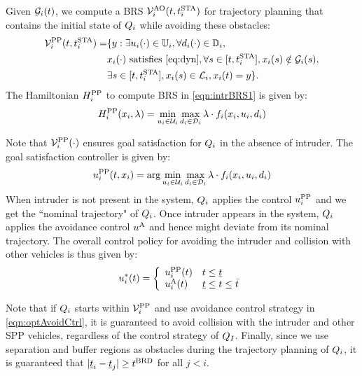 Given $\mathcal{G}_i(t)$, we compute a BRS $\mathcal{V}^{\text{AO}}_{i}(t, t^\text{STA}_i)$ for trajectory planning that contains the initial state of $Q_i$ while avoiding these obstacles:
\begin{equation} \label{eqn:intrBRS1}
\begin{aligned}
\brs^{\text{PP}}_{i}(t, \sta_i) = & \{y: \exists \ctrl_i(\cdot) \in \cfset_i, \forall \dstb_i(\cdot) \in \dfset_i, \\
& \state_i(\cdot) \text{ satisfies \eqref{eq:dyn}}, \forall s \in [t, \sta_i], \state_i(s) \notin \obsset_i(s), \\
& \exists s \in [t, \sta_i], \state_i(s) \in \targetset_i, \state_i(t) = y \}.
\end{aligned}
\end{equation}
The Hamiltonian $H^{\text{PP}}_{i}$ to compute BRS in \eqref{eqn:intrBRS1} is given by:
\begin{equation} \label{eqn:BRSham}
\ham^{\text{PP}}_{i}(\state_i, \costate) = \min_{\ctrl_i \in \cset_i} \max_{\dstb_i \in \dset_i} \costate \cdot f_i (\state_i, \ctrl_i, \dstb_i)
\end{equation}

Note that $\mathcal{V}^{\text{PP}}_{i}(\cdot)$ ensures goal satisfaction for $Q_i$ in the absence of intruder. The goal satisfaction controller is given by:
\begin{equation} \label{eqn:PPPolicy}
{\ctrl^{\text{PP}}_{i}}(t, \state_i) = \arg \min_{\ctrl_i \in \cset_i} \max_{\dstb_i \in \dset_i} \costate \cdot f_i (\state_i, \ctrl_i, \dstb_i)
\end{equation}
When intruder is not present in the system, $Q_i$ applies the control ${u^{\text{PP}}_{i}}$ and we get the ``nominal trajectory" of $Q_i$. Once intruder appears in the system, $Q_i$ applies the avoidance control ${u^{\text{A}}}$ and hence might deviate from its nominal trajectory. The overall control policy for avoiding the intruder and collision with other vehicles is thus given by:
\begin{equation} \label{eqn:final_nominalcontroller}
{\ctrl^*_{i}}(t) = 
\left \{ 
\begin{array}{ll}
{\ctrl^{\text{PP}}_{i}}(t) & t \leq \tsa\\
{\ctrl^{\text{A}}_{i}}(t) & \tsa\leq t \leq \tea
\end{array}
\right.
\end{equation}

Note that if $Q_i$ starts within $\mathcal{V}^{\text{PP}}_{i}$ and use avoidance control strategy in \eqref{eqn:optAvoidCtrl}, it is guaranteed to avoid collision with the intruder and other SPP vehicles, regardless of the control strategy of $Q_{I}$. Finally, since we use separation and buffer regions as obstacles during the trajectory planning of $Q_i$, it is guaranteed that $|\underline{t}_i - \underline{t}_j| \geq t^\text{BRD}$ for all $j < i$. 

